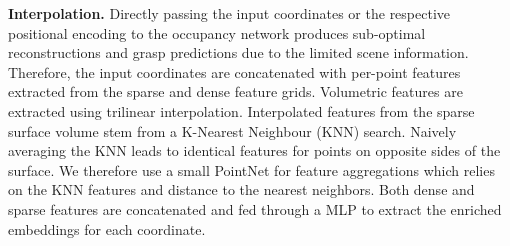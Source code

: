 \documentclass[letterpaper, 10 pt, conference]{ieeeconf}  %
\begin{document}
\noindent\textbf{Interpolation.}
Directly passing the input coordinates or the respective positional encoding to the occupancy network produces sub-optimal reconstructions and grasp predictions due to the limited scene information.
Therefore, the input coordinates are concatenated with per-point features extracted from the sparse and dense feature grids.
Volumetric features are extracted using trilinear interpolation.
Interpolated features from the sparse surface volume stem from a K-Nearest Neighbour (KNN) search. Naively averaging the KNN leads to identical features for points on opposite sides of the surface.
We therefore use a small PointNet for feature aggregations which relies on the KNN features and distance to the nearest neighbors.
Both dense and sparse features are concatenated and fed through a MLP to extract the enriched embeddings for each coordinate. 
\end{document}
